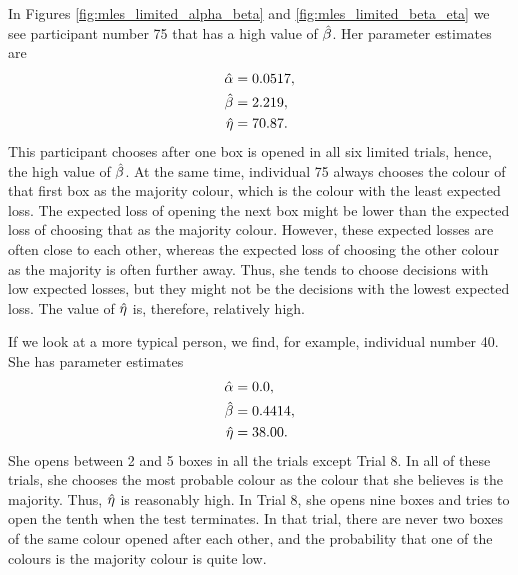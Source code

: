 In Figures \ref{fig:mles_limited_alpha_beta} and \ref{fig:mles_limited_beta_eta} we see participant number 75 that has a high value of $\hat{\beta}$. Her parameter estimates are
\begin{equation}
\label{mles_lim_person75}
    \begin{aligned}
        \hat{\alpha} &= 0.0517,\\
        \hat{\beta} &= 2.219,\\
        \hat{\eta} &= 70.87.
    \end{aligned}
\end{equation}
This participant chooses after one box is opened in all six limited trials, hence, the high value of $\hat{\beta}$. At the same time, individual 75 always chooses the colour of that first box as the majority colour, which is the colour with the least expected loss. The expected loss of opening the next box might be lower than the expected loss of choosing that as the majority colour. However, these expected losses are often close to each other, whereas the expected loss of choosing the other colour as the majority is often further away. Thus, she tends to choose decisions with low expected losses, but they might not be the decisions with the lowest expected loss. The value of $\hat{\eta}$ is, therefore, relatively high.

If we look at a more typical person, we find, for example, individual number 40. She has parameter estimates
\begin{equation}
\label{mles_lim_person40}
    \begin{aligned}
        \hat{\alpha} &= 0.0,\\
        \hat{\beta} &= 0.4414,\\
        \hat{\eta} &= 38.00.
    \end{aligned}
\end{equation}
She opens between 2 and 5 boxes in all the trials except Trial 8. In all of these trials, she chooses the most probable colour as the colour that she believes is the majority. Thus, $\hat{\eta}$ is reasonably high. In Trial 8, she opens nine boxes and tries to open the tenth when the test terminates. In that trial, there are never two boxes of the same colour opened after each other, and the probability that one of the colours is the majority colour is quite low. 









